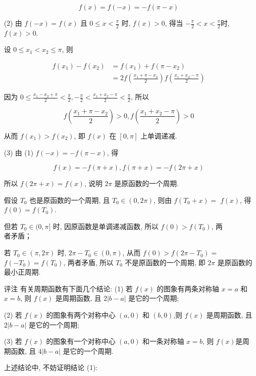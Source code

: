 	$$
		f(x)=f(-x)=-f(\pi-x)
	$$

	(2) 由 $f(-x)=f(x)$ 且 $0 \leqslant x<\frac{\pi}{2}$ 时, $f(x)>0$, 得当 $-\frac{\pi}{2}<x<\frac{\pi}{2}$时, $f(x)>0$.

	设 $0 \leqslant x_{1}<x_{2} \leqslant \pi$, 则

	$$
		\begin{aligned}
			f\left(x_{1}\right)-f\left(x_{2}\right) & =f\left(x_{1}\right)+f\left(\pi-x_{2}\right)                                       \\
			                                        & =2 f\left(\frac{x_{1}+\pi-x_{2}}{2}\right) f\left(\frac{x_{1}+x_{2}-\pi}{2}\right)
		\end{aligned}
	$$

	因为 $0 \leqslant \frac{x_{1}-x_{2}+\pi}{2}<\frac{\pi}{2},-\frac{\pi}{2}<\frac{x_{1}+x_{2}-\pi}{2}<\frac{\pi}{2}$, 所以

	$$
		f\left(\frac{x_{1}+\pi-x_{2}}{2}\right)>0, f\left(\frac{x_{1}+x_{2}-\pi}{2}\right)>0
	$$

	从而 $f\left(x_{1}\right)>f\left(x_{2}\right)$, 即 $f(x)$ 在 $[0, \pi]$ 上单调递减.

	(3) 由 (1) $f(-x)=-f(\pi-x)$, 得

	$$
		f(x)=-f(\pi+x), f(\pi+x)=-f(2 \pi+x)
	$$

	所以 $f(2 \pi+x)=f(x)$, 说明 $2 \pi$ 是原函数的一个周期.

	假设 $T_{0}$ 也是原函数的一个周期, 且 $T_{0} \in(0,2 \pi)$, 则由 $f\left(T_{0}+x\right)=$ $f(x)$, 得 $f(0)=f\left(T_{0}\right)$.

	但若 $T_{0} \in(0, \pi]$ 时, 因原函数是单调递减函数, 所以 $f(0)>f\left(T_{0}\right)$, 两\\
	者矛盾；

	若 $T_{0} \in(\pi, 2 \pi)$ 时, $2 \pi-T_{0} \in(0, \pi)$, 从而 $f(0)>f\left(2 \pi-T_{0}\right)=$ $f\left(-T_{0}\right)=f\left(T_{0}\right)$, 两者矛盾, 所以 $T_{0}$ 不是原函数的一个周期, 即 $2 \pi$ 是原函数的最小正周期.

	评注 有关周期函数有下面几个结论: (1) 若 $f(x)$ 的图象有两条对称轴 $x=a$ 和 $x=b$, 则 $f(x)$ 是周期函数, 且 $2|b-a|$ 是它的一个周期;

	(2) 若 $f(x)$ 的图象有两个对称中心 $(a, 0)$ 和 $(b, 0)$,则 $f(x)$ 是周期函数, 且 $2|b-a|$ 是它的一个周期;

	(3) 若 $f(x)$ 的图象有一个对称中心 $(a, 0)$ 和一条对称轴 $x=b$, 则 $f(x)$是周期函数, 且 $4|b-a|$ 是它的一个周期.

	上述结论中, 不妨证明结论 (1):

